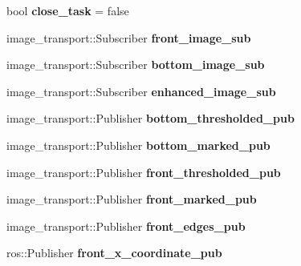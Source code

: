 \begin{DoxyCompactItemize}
\mbox{\label{classBase__class_ae03833accc82e68126825245dc1982fa}} 
bool {\bfseries close\+\_\+task} = false
\item 
\mbox{\label{classBase__class_a4e631c16dc345e509bdeeeefe7fea10c}} 
image\+\_\+transport\+::\+Subscriber {\bfseries front\+\_\+image\+\_\+sub}
\item 
\mbox{\label{classBase__class_a271cb980412b067997fc97d9693952c2}} 
image\+\_\+transport\+::\+Subscriber {\bfseries bottom\+\_\+image\+\_\+sub}
\item 
\mbox{\label{classBase__class_a2597f44ae992acb9346c5236981dde8a}} 
image\+\_\+transport\+::\+Subscriber {\bfseries enhanced\+\_\+image\+\_\+sub}
\item 
\mbox{\label{classBase__class_a39c380a01e7bd17d10feadb1422b3d32}} 
image\+\_\+transport\+::\+Publisher {\bfseries bottom\+\_\+thresholded\+\_\+pub}
\item 
\mbox{\label{classBase__class_aa6ba450a5a291ca101a51767a6e8f9b7}} 
image\+\_\+transport\+::\+Publisher {\bfseries bottom\+\_\+marked\+\_\+pub}
\item 
\mbox{\label{classBase__class_abd16a7279fdd1a28794cd6fd5750d9e7}} 
image\+\_\+transport\+::\+Publisher {\bfseries front\+\_\+thresholded\+\_\+pub}
\item 
\mbox{\label{classBase__class_a658ae3fc1783f2cf7b2f58c0e9c83d94}} 
image\+\_\+transport\+::\+Publisher {\bfseries front\+\_\+marked\+\_\+pub}
\item 
\mbox{\label{classBase__class_a04bfec1a0dd9622111cc9edcffa5b4ef}} 
image\+\_\+transport\+::\+Publisher {\bfseries front\+\_\+edges\+\_\+pub}
\item 
\mbox{\label{classBase__class_ab4a69be5b6876ccc175f252a8b914fd8}} 
ros\+::\+Publisher {\bfseries front\+\_\+x\+\_\+coordinate\+\_\+pub}
\item 
\mbox{\label{classBase__class_a06b6b24d43c36430aa9acbb5dff10bbc}} 

\end{DoxyCompactItemize}
